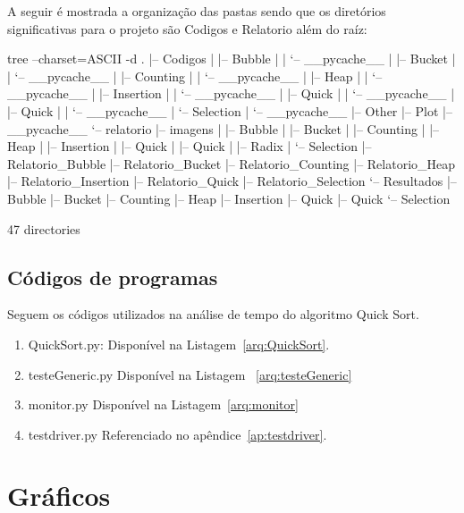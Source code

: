 \documentclass[12pt,a4paper,twoside]{report}
\begin{document}
A seguir é mostrada a organização das pastas sendo que os diretórios significativas para o projeto são Codigos e Relatorio além do raíz:
\begin{terminal}
tree --charset=ASCII -d
.
|-- Codigos
|   |-- Bubble
|   |   `-- __pycache__
|   |-- Bucket
|   |   `-- __pycache__
|   |-- Counting
|   |   `-- __pycache__
|   |-- Heap
|   |   `-- __pycache__
|   |-- Insertion
|   |   `-- __pycache__
|   |-- Quick
|   |   `-- __pycache__
|   |-- Quick
|   |   `-- __pycache__
|   `-- Selection
|       `-- __pycache__
|-- Other
|-- Plot
|-- __pycache__
`-- relatorio
    |-- imagens
    |   |-- Bubble
    |   |-- Bucket
    |   |-- Counting
    |   |-- Heap
    |   |-- Insertion
    |   |-- Quick
    |   |-- Quick
    |   |-- Radix
    |   `-- Selection
    |-- Relatorio_Bubble
    |-- Relatorio_Bucket
    |-- Relatorio_Counting
    |-- Relatorio_Heap
    |-- Relatorio_Insertion
    |-- Relatorio_Quick
    |-- Relatorio_Selection
    `-- Resultados
        |-- Bubble
        |-- Bucket
        |-- Counting
        |-- Heap
        |-- Insertion
        |-- Quick
        |-- Quick
        `-- Selection

47 directories
\end{terminal}

\section{Códigos de programas}
Seguem os códigos utilizados na análise de tempo do algoritmo Quick Sort.
\begin{enumerate}

\item QuickSort.py:
Disponível na Listagem~\ref{arq:QuickSort}.


\item testeGeneric.py
Disponível na Listagem ~\ref{arq:testeGeneric}


\item monitor.py
Disponível na Listagem~\ref{arq:monitor}



\item testdriver.py
 Referenciado no apêndice~\ref{ap:testdriver}.
\end{enumerate}


\chapter{Gráficos}
\end{document}
